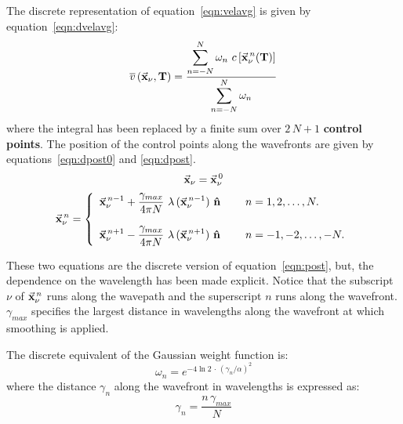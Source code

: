 The discrete representation of equation~\ref{eqn:velavg} is given
by equation~\ref{eqn:dvelavg}:
%
\begin{equation}
 \overline{v}\, (\vec{\bf x}_{\nu},{\bf T\/}) = \frac{
 \displaystyle \sum_{n=-N}^{N}
 \omega_{n}\ c\, [\vec{\bf x}_{\nu}^{\, n}({\bf T\/})] }
 {\displaystyle \sum_{n=-N}^{N}
 \omega_{n}}
\label{eqn:dvelavg}
\end{equation}
%
where the integral has been replaced by a finite sum over $2\,N+1$
{\bf control points\/}. The position of the control points along the
wavefronts
are given by equations~\ref{eqn:dpost0} and \ref{eqn:dpost}.
%
\begin{equation}
 \vec{\bf x}_{\nu} = \vec{\bf x}_{\nu}^{\, 0}
\label{eqn:dpost0}
\end{equation}
%
\begin{equation}
\vec{\bf x}_{\nu}^{\, n} = \left\{ \begin{array}{lll}
        \displaystyle
        \vec{\bf x}_{\nu}^{\, n-1} + \frac{\gamma_{max}}
            {4\pi N}\ \lambda\, (\vec{\bf x}_{\nu}^{\, n-1})\ {\bf \hat{n}} &
        \; &
        n=1,2, \ldots, N. \\
        \, \, \,          \\
        \displaystyle
        \vec{\bf x}_{\nu}^{\, n+1} - \frac{\gamma_{max}}
            {4\pi N}\ \lambda\, (\vec{\bf x}_{\nu}^{\, n+1})\ {\bf \hat{n}} &
        \; &
        n=-1,-2, \ldots, -N. \end{array}
        \right.
\label{eqn:dpost}
\end{equation}

These two equations are the discrete version of equation~\ref{eqn:post}, but,
the dependence on the wavelength has been made explicit.
Notice that the subscript $\nu$ of $\vec{\bf x}_{\nu}^{\, n}$ 
runs along the wavepath and the
superscript $n$ runs along the wavefront.
$\gamma_{max}$ specifies the largest distance in wavelengths along
the wavefront at which smoothing is applied. 

The discrete equivalent of the Gaussian weight function is:
%
\begin{equation}
 \omega_{n} = e^{-4 \ln 2\, \cdot\, (\gamma_{n}/\alpha)^{2}}
\label{eqn:dgauss}
\end{equation}
%
where the distance $\gamma_{n}$ along the wavefront in wavelengths
is expressed as:
%
\begin{equation}
 \gamma_{n} = \frac{n\, \gamma_{max}}{N}
\label{eqn:gamma}
\end{equation}

